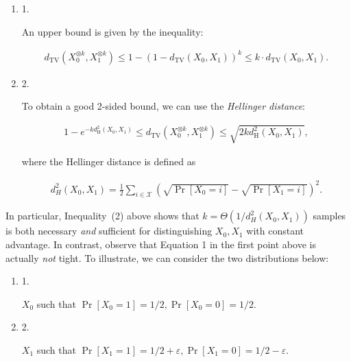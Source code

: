 \documentclass[10pt,a4paper]{article}
\begin{document}
\begin{enumerate}


\item[] 
1. 


An upper bound is given by the inequality:\par


\[\begin{gathered}
d_{\mathrm{TV}}(X_{0}^{\otimes k},X_{1}^{\otimes k})\leq 1-(1-d_{\mathrm{TV}}(X_{0},X_{1}))^{k}\leq k\cdot d_{\mathrm{TV}}(X_{0},X_{1}).
\end{gathered}\]





\item[] 
2. 


To obtain a good 2-sided bound, we can use the \emph{Hellinger distance}:\par


\[\begin{gathered}
1-e^{-kd^{2}_{\mathrm{H}}(X_{0},X_{1})}\leq d_{\mathrm{TV}}(X_{0}^{\otimes k},X_{1}^{\otimes k})\leq\sqrt{2kd^{2}_{\mathrm{H}}(X_{0},X_{1})},
\end{gathered}\]


where the Hellinger distance is defined as\par


\[\begin{gathered}
d^{2}_{H}(X_{0},X_{1})=\frac{1}{2}\sum_{i\in\mathcal{X}}\left(\sqrt{\Pr[X_{0}=i]}-\sqrt{\Pr[X_{1}=i]}\right)^{2}.
\end{gathered}\]





\end{enumerate}




In particular, Inequality (2) above shows that $k=\Theta\left(1/d^{2}_{H}(X_{0},X_{1})\right)$ samples is both necessary \emph{and} sufficient for distinguishing $X_{0},X_{1}$ with constant advantage. In contrast, observe that Equation 1 in the first point above is actually \emph{not} tight. To illustrate, we can consider the two distributions below:\par


\begin{enumerate}


\item[] 
1. 


$X_{0}$ such that $\Pr[X_{0}=1]=1/2,\Pr[X_{0}=0]=1/2$.\par





\item[] 
2. 


$X_{1}$ such that $\Pr[X_{1}=1]=1/2+\varepsilon,\Pr[X_{1}=0]=1/2-\varepsilon$.\par





\end{enumerate}
\end{document}

